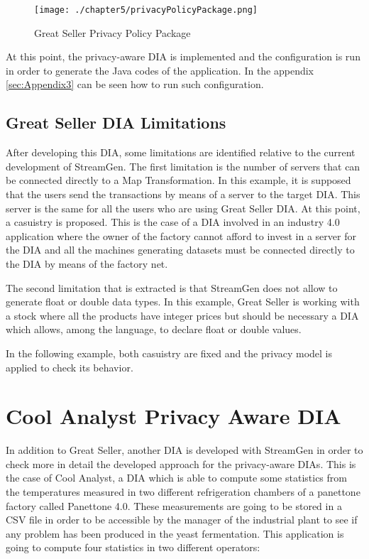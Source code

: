 \begin{figure}
\centering
{\texttt{[image: ./chapter5/privacyPolicyPackage.png]}}
\caption{Great Seller Privacy Policy Package}
\label{fig:Great Seller Privacy Policy Package}
\end{figure}

At this point, the privacy-aware DIA is implemented and the configuration is run in order to generate the Java codes of the application. In the appendix \ref{sec:Appendix3} can be seen how to run such configuration.

\subsection{Great Seller DIA Limitations}

After developing this DIA, some limitations are identified relative to the current development of StreamGen. The first limitation is the number of servers that can be connected directly to a Map Transformation. In this example, it is supposed that the users send the transactions by means of a server to the target DIA. This server is the same for all the users who are using Great Seller DIA. At this point, a casuistry is proposed. This is the case of a DIA involved in an industry 4.0 application where the owner of the factory cannot afford to invest in a server for the DIA and all the machines generating datasets must be connected directly to the DIA by means of the factory net.

The second limitation that is extracted is that StreamGen does not allow to generate float or double data types. In this example, Great Seller is working with a stock where all the products have integer prices but should be necessary a DIA which allows, among the language, to declare float or double values.

In the following example, both casuistry are fixed and the privacy model is applied to check its behavior.

\section{Cool Analyst Privacy Aware DIA}

In addition to Great Seller, another DIA is developed with StreamGen in order to check more in detail the developed approach for the privacy-aware DIAs. This is the case of Cool Analyst, a DIA which is able to compute some statistics from the temperatures measured in two different refrigeration chambers of a panettone factory called Panettone 4.0. These measurements are going to be stored in a CSV file in order to be accessible by the manager of the industrial plant to see if any problem has been produced in the yeast fermentation. This application is going to compute four statistics in two different operators:

